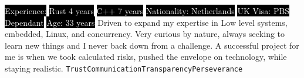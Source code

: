 \documentclass[9pt]{developercv} %
\begin{document}
\begin{minipage}[t]{0.2\textwidth} %
	\vspace{0.5em} %
    \setlength{\fboxsep}{0pt}%
    \setlength{\fboxrule}{1pt}%
\end{minipage}
\hspace{3.5em}
\begin{minipage}[t]{0.7\textwidth} %
	\vspace{0.5em} %


    \colorbox{black}{\textcolor{white}{Experience:}}
    \colorbox{black}{\textcolor{white}{Rust 4 years}}
    \colorbox{black}{\textcolor{white}{C++ 7 years}}
    \newline{}
    \colorbox{black}{\textcolor{white}{Nationality: Netherlands}}
    \colorbox{black}{\textcolor{white}{UK Visa: PBS Dependant}}
    \newline{}
    \colorbox{black}{\textcolor{white}{Age: 33 years}}
    \newline{}
    \newline{}
     Driven to expand my expertise in Low level systems, embedded, Linux, and concurrency. Very curious by nature, always seeking to learn new things and I never back down from a challenge.\newline{}
    A successful project for me is when we took calculated risks, pushed the
    envelope on technology, while staying realistic.
    \newline{}
    \texttt{Trust}\slashsep\texttt{Communication}\slashsep\texttt{Transparency}\slashsep\texttt{Perseverance}
\end{minipage}
\end{document}
